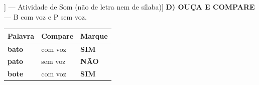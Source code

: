 \begin{exercicio}[Som /b/ [[b]] --- Atividade de Som (não de letra nem de sílaba)]
\textbf{D) OUÇA E COMPARE} --- B com voz e P sem voz.

\begin{center}
\begin{tabular}{@{}p{4.2cm}p{6.2cm}p{1.6cm}@{}}
\hline
\textbf{Palavra} & \textbf{Compare} & \textbf{Marque} \\
\hline
\textbf{bato} & com voz & \textbf{SIM} \\
\textbf{pato} & sem voz & \textbf{NÃO} \\
\textbf{bote} & com voz & \textbf{SIM} \\
\hline
\end{tabular}
\end{center}

\end{exercicio}

